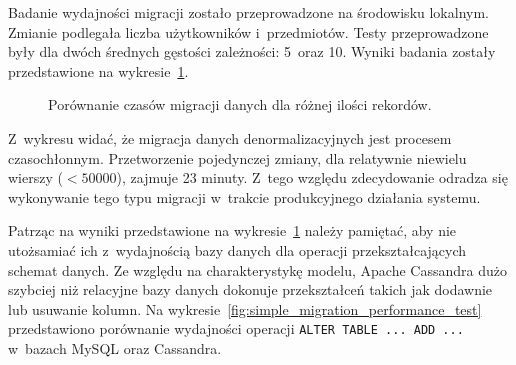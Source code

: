 Badanie wydajności migracji zostało przeprowadzone na środowisku lokalnym. Zmianie podlegała liczba użytkowników i~przedmiotów. Testy przeprowadzone były dla dwóch średnych gęstości zależności: 5~oraz 10. Wyniki badania zostały przedstawione na wykresie~\ref{fig:migration_performance_test}.

\begin{figure}[ht!]
	\centering

	\caption{Porównanie czasów migracji danych dla różnej ilości rekordów.}
	\label{fig:migration_performance_test}
\end{figure}

Z~wykresu widać, że migracja danych denormalizacyjnych jest procesem czasochłonnym. Przetworzenie pojedynczej zmiany, dla relatywnie niewielu wierszy ($< 50000$), zajmuje 23 minuty. Z~tego względu zdecydowanie odradza się wykonywanie tego typu migracji w~trakcie produkcyjnego działania systemu.

Patrząc na wyniki przedstawione na wykresie~\ref{fig:migration_performance_test} należy pamiętać, aby nie utożsamiać ich z~wydajnością bazy danych dla operacji przekształcających schemat danych. Ze względu na charakterystykę modelu, Apache Cassandra dużo szybciej niż relacyjne bazy danych dokonuje przekształceń takich jak dodawnie lub usuwanie kolumn. Na wykresie~\ref{fig:simple_migration_performance_test} przedstawiono porównanie wydajności operacji \verb+ALTER TABLE ... ADD ...+ w~bazach MySQL oraz Cassandra.

